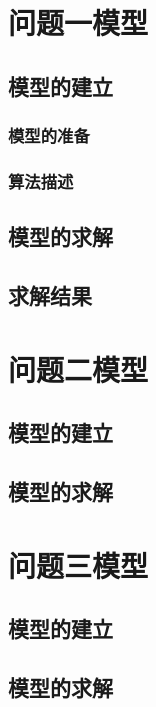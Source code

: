 \documentclass[withoutpreface,bwprint]{cumcmthesis} %
\begin{document}
	
	\section{问题一模型}
		\subsection{模型的建立}
		
			\subsubsection{模型的准备}
		
			\subsubsection{算法描述}
	
		\subsection{模型的求解}
	
	
		\subsection{求解结果}
	
	\section{问题二模型}
		\subsection{模型的建立}
	
	
		\subsection{模型的求解}
	
	\section{问题三模型}
		\subsection{模型的建立}
	
	
		\subsection{模型的求解}
	
\end{document}
